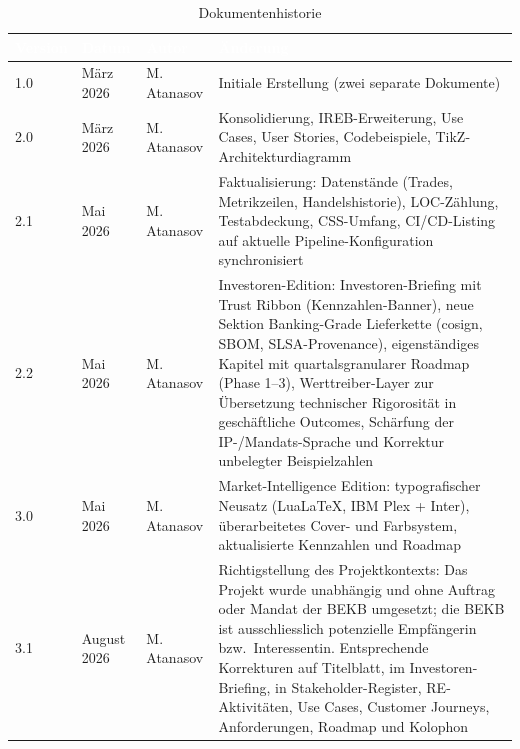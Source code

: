 \documentclass[11pt, a4paper, oneside, openany]{report}
\begin{document}
\vspace{1cm}
\begin{table}[H]
\centering
\caption{Dokumentenhistorie}
\sffamily\small
{}
\begin{tabularx}{\textwidth}{l l l X}
  \toprule
  \rowcolor{DeepNavy} \textcolor{white}{\textbf{Version}} & \textcolor{white}{\textbf{Datum}} & \textcolor{white}{\textbf{Autor}} & \textcolor{white}{\textbf{Änderung}} \\
  \midrule
  1.0 & März 2026 & M.\,Atanasov & Initiale Erstellung (zwei separate Dokumente) \\
  2.0 & März 2026 & M.\,Atanasov & Konsolidierung, IREB-Erweiterung, Use Cases, User Stories, Codebeispiele, TikZ-Architekturdiagramm \\
  2.1 & Mai 2026  & M.\,Atanasov & Faktualisierung: Datenstände (Trades, Metrikzeilen, Handelshistorie), LOC-Zählung, Testabdeckung, CSS-Umfang, CI/CD-Listing auf aktuelle Pipeline-Konfiguration synchronisiert \\
  2.2 & Mai 2026  & M.\,Atanasov & Investoren-Edition: Investoren-Briefing mit Trust Ribbon (Kennzahlen-Banner), neue Sektion Banking-Grade Lieferkette (cosign, SBOM, SLSA-Provenance), eigenständiges Kapitel mit quartalsgranularer Roadmap (Phase 1--3), Werttreiber-Layer zur Übersetzung technischer Rigorosität in geschäftliche Outcomes, Schärfung der IP-/Mandats-Sprache und Korrektur unbelegter Beispielzahlen \\
  3.0 & Mai 2026  & M.\,Atanasov & Market-Intelligence Edition: typografischer Neusatz (LuaLaTeX, IBM Plex + Inter), überarbeitetes Cover- und Farbsystem, aktualisierte Kennzahlen und Roadmap \\
  3.1 & August 2026 & M.\,Atanasov & Richtigstellung des Projektkontexts: Das Projekt wurde unabhängig und ohne Auftrag oder Mandat der BEKB umgesetzt; die BEKB ist ausschliesslich potenzielle Empfängerin bzw.\ Interessentin. Entsprechende Korrekturen auf Titelblatt, im Investoren-Briefing, in Stakeholder-Register, RE-Aktivitäten, Use Cases, Customer Journeys, Anforderungen, Roadmap und Kolophon \\
  \bottomrule
\end{tabularx}
\end{table}

\tableofcontents
\clearpage
\listoftables
\clearpage
\listoffigures
\clearpage

\setcounter{page}{1}
\end{document}
